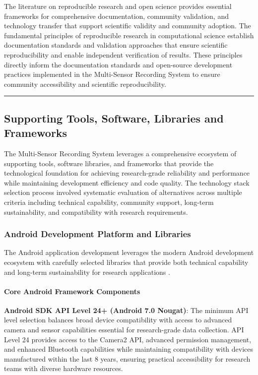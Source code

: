 \documentclass[11pt,a4paper]{article}
\begin{document}
The literature on reproducible research and open science provides essential frameworks for comprehensive documentation,
community validation, and technology transfer that support scientific validity and community adoption. The fundamental
principles of reproducible research in computational science establish documentation standards and validation approaches
that ensure scientific reproducibility and enable independent verification of results. These principles directly inform
the documentation standards and open-source development practices implemented in the Multi-Sensor Recording System to
ensure community accessibility and scientific reproducibility.

\hrule

\subsection{Supporting Tools, Software, Libraries and Frameworks}

The Multi-Sensor Recording System leverages a comprehensive ecosystem of supporting tools, software libraries, and
frameworks that provide the technological foundation for achieving research-grade reliability and performance while
maintaining development efficiency and code quality. The technology stack selection process involved systematic
evaluation of alternatives across multiple criteria including technical capability, community support, long-term
sustainability, and compatibility with research requirements.

\subsubsection{Android Development Platform and Libraries}

The Android application development leverages the modern Android development ecosystem with carefully selected libraries
that provide both technical capability and long-term sustainability for research applications .

\paragraph{Core Android Framework Components}

\textbf{Android SDK API Level 24+ (Android 7.0 Nougat)}: The minimum API level selection balances broad device compatibility
with access to advanced camera and sensor capabilities essential for research-grade data collection. API Level 24
provides access to the Camera2 API, advanced permission management, and enhanced Bluetooth capabilities while
maintaining compatibility with devices manufactured within the last 8 years, ensuring practical accessibility for
research teams with diverse hardware resources.
\end{document}
